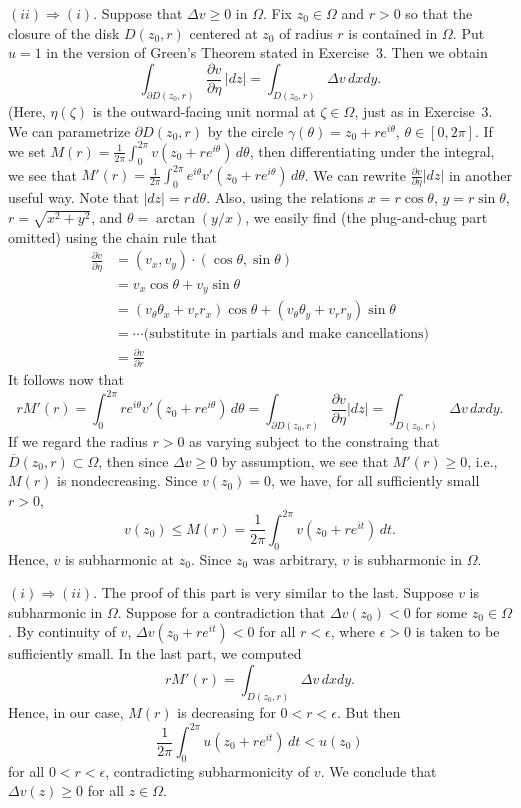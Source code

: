 \documentclass[11pt]{book}
\theoremstyle{definition}
\begin{document}
\begin{enumerate}
    $(ii) \Rightarrow (i)$.  Suppose that $\Delta v \geq 0$ in $\Omega$.  Fix $z_0\in \Omega$ and $r>0$ so that the closure of the disk $D(z_0, r)$ centered at $z_0$ of radius $r$ is contained in $\Omega$. Put $u=1$ in the version of Green's Theorem stated in Exercise~3.  Then we obtain 
    \[ \int_{\partial D(z_0, r)}  \frac{\partial v}{\partial \eta} \, |dz| = \int_{D(z_0,r)} \Delta v \, dxdy. \]  (Here, $\eta(\zeta)$ is the outward-facing unit normal at $\zeta\in \Omega$, just as in Exercise~3.  We can parametrize $\partial D(z_0, r)$ by the circle $ \gamma(\theta) = z_0 + re^{i\theta}$, $\theta\in [0,2\pi]$.  If we set $M(r) = \frac{1}{2\pi} \int_{0}^{2\pi} v(z_0 + re^{i\theta}) \, d\theta$, then differentiating under the integral, we see that $M'(r) = \frac{1}{2\pi} \int_0^{2\pi} e^{i\theta} v'(z_0+re^{i\theta}) \, d\theta$.  We can rewrite $\frac{\partial v}{\partial \eta} |dz|$ in another useful way.  Note that $|dz| = r \, d\theta$.  Also, using the relations $x=r \cos \theta$, $y = r\sin \theta$, $r=\sqrt{x^2+y^2}$, and $\theta = \arctan(y/x)$,  we easily find (the plug-and-chug part omitted) using the chain rule that 
    \begin{align*}
        \frac{\partial v}{\partial \eta} &= (v_x, v_y) \cdot (\cos \theta, \sin \theta) \\
        &= v_x \cos \theta + v_y \sin \theta\\
        &= (v_\theta \theta_x + v_r r_x) \cos \theta + (v_\theta \theta_y + v_r r_y) \sin\theta \\
        &= \cdots \text{(substitute in partials and make cancellations)} \\
        &=  \frac{\partial v}{\partial r} 
    \end{align*}
    It follows now that
    \[r  M'(r) =  \int_0^{2\pi} re^{i\theta} v'(z_0+re^{i\theta}) \, d\theta = \int_{\partial D(z_0,r)} \frac{\partial v}{\partial \eta} |dz| = \int_{D(z_0,r)} \Delta v \, dxdy. \]  If we regard the radius $r>0$ as varying subject to the constraing that $\overline D(z_0, r) \subset \Omega$, then since $\Delta v \geq 0$ by assumption, we see that $M'(r)\geq 0$, i.e., $M(r)$ is nondecreasing.   Since $v(z_0) = 0$, we have, for all sufficiently small $r>0$,
    \[ v(z_0) \leq M(r) = \frac{1}{2\pi} \int_{0}^{2\pi} v(z_0+re^{it}) \, dt. \] Hence, $v$ is subharmonic at $z_0$.  Since $z_0$ was arbitrary, $v$ is subharmonic in $\Omega$.  

    $(i) \Rightarrow (ii)$.  The proof of this part is very similar to the last.  Suppose $v$ is subharmonic in $\Omega$.  Suppose for a contradiction that $\Delta v (z_0) < 0$ for some $z_0\in \Omega$.  By continuity of $v$, $\Delta v (z_0 + re^{it}) < 0$ for all $r<\epsilon$, where $\epsilon > 0$ is taken to be sufficiently small.   In the last part, we computed
    \[ rM'(r) = \int_{D(z_0, r)} \Delta v \, dxdy. \] Hence, in our case, $M(r)$ is decreasing for $0 <r<\epsilon$.  But then 
    \[ \frac{1}{2\pi} \int_{0}^{2\pi} u(z_0+re^{it}) \, dt < u(z_0) \] for all $0< r < \epsilon$, contradicting subharmonicity of $v$. We conclude that $\Delta v (z) \geq 0$  for all $z\in \Omega$. 


\end{enumerate}
\end{document}
